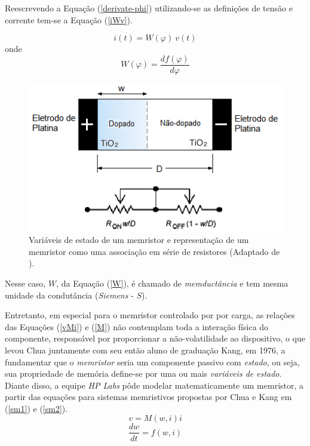 \documentclass{ceel}
\begin{document}
\begin{multicols}{2}
Reescrevendo a Equação (\ref{derivate-phi}) utilizando-se as definições de tensão e corrente tem-se a  Equação (\ref{iWv}).

\begin{equation}\label{iWv}
i(t)=W(\varphi)\ v(t)
\end{equation}
\noindent onde
\begin{equation} \label{W}
W(\varphi) =\dfrac{df(\varphi)}{d\varphi}
\end{equation}

\begin{figure}[H]
\centering
\includegraphics[width=0.9\columnwidth]{new-w-modified}
\caption{Variáveis de estado de um memristor e representação de um memristor como uma associação em série de resistores (Adaptado de \cite{image}).}\label{w}
\end{figure}

\vspace{0.2cm}
Nesse caso, $W$, da Equação (\ref{W}), é chamado de \textit{memductância} e tem mesma unidade da condutância (\textit{Siemens} - $S$).

Entretanto, em especial para o memristor controlado por por carga, as relações das Equações (\ref{vMi}) e (\ref{M}) não contemplam toda a interação física do componente, responsável por proporcionar a não-volatilidade ao dispositivo, o que levou Chua juntamente com seu então aluno de graduação Kang, em 1976, a fundamentar que o \emph{memristor} seria um componente passivo com \emph{estado}, ou seja, sua propriedade de memória define-se por uma ou mais \emph{variáveis de estado}.
Diante disso, a equipe \emph{HP Labs} pôde modelar matematicamente um memristor, a partir das equações para sistemas memristivos propostas por Chua e Kang \cite{1976} em (\ref{sm1}) e (\ref{sm2}).
\begin{equation}\label{sm1}
v=M(w, i)i
\end{equation}
\begin{equation}\label{sm2}
\dfrac{dw}{dt}=f(w, i)
\end{equation}
\vspace{0.00001cm}


\end{multicols}
\end{document}
